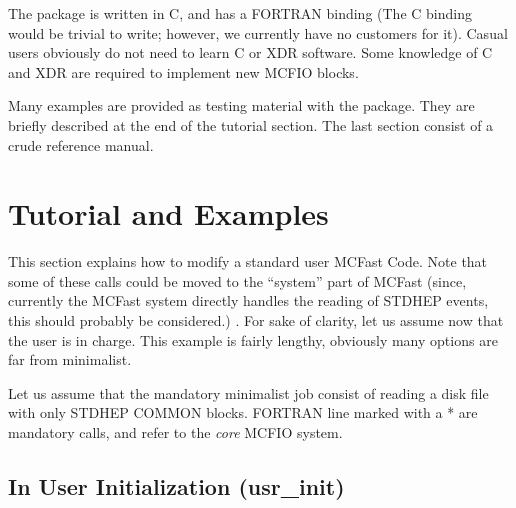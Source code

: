 	The package is written in C, and has a FORTRAN binding  (The 
C binding would be trivial to write; however, we currently have no customers 
for it).  Casual users obviously do not need to learn C or XDR software. Some 
knowledge of C and XDR are required to implement new MCFIO blocks.

	Many examples are provided as testing material with the package. 
They are briefly described at the end of the tutorial section. The last 
section consist of a crude reference manual. 

\section{Tutorial and Examples}


This section explains how to modify a standard user MCFast Code. Note that  some of
these calls could be moved to the ``system'' part of MCFast (since, currently
the MCFast system directly handles the  reading of STDHEP events, this  should
probably be considered.) . For sake of clarity, let us assume now that the
user is in charge. This example is fairly lengthy, obviously many  options are
far from minimalist.
 
\vspace{.1in}
  Let us assume that the mandatory  minimalist job
consist of reading a disk file with only STDHEP COMMON blocks. FORTRAN line 
marked with a * are mandatory calls, and refer to the {\em core } MCFIO 
system. 
 

\subsection{In User Initialization (usr\_init)}
 
